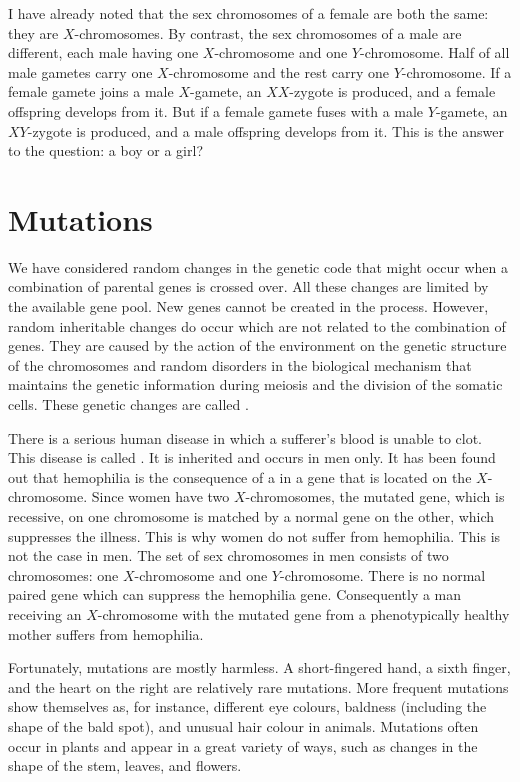  I have already noted that the sex chromosomes of
a female are both the same: they are $X$-chromosomes. By contrast, the
sex chromosomes of a male are different, each male having one
$X$-chromosome and one $Y$-chromosome. Half of all male gametes carry
one $X$-chromosome and the rest carry one $Y$-chromosome. If a female
gamete joins a male $X$-gamete, an $XX$-zygote is produced, and a female
offspring develops from it. But if a female gamete fuses with a male
$Y$-gamete, an $XY$-zygote is produced, and a male offspring develops from it. This is the answer to the question: a boy or a girl?

\section{Mutations }%
We have considered random changes in the genetic code that might
occur when a combination of parental genes is crossed over. All these
changes are limited by the available gene pool. New genes cannot be
created in the process. However, random inheritable changes do occur
which are not related to the combination of genes. They are caused by
the action of the environment on the genetic structure of the
chromosomes and random disorders in the biological mechanism that
maintains the genetic information during meiosis and the division of the
somatic cells. These genetic changes are called .

 There is a serious human disease in
which a sufferer's blood is unable to clot. This disease is called . It is inherited and occurs in men only. It has been found out that hemophilia is the consequence of a  in a gene that is located on the $X$-chromosome. Since women have two $X$-chromosomes, the mutated gene, which is recessive, on one chromosome is matched by
a normal gene on the other, which suppresses the illness. This is why
women do not suffer from hemophilia. This is not the case in men. The
set of sex chromosomes in men consists of two  chromosomes: one $X$-chromosome and one $Y$-chromosome. There is no normal paired gene which can suppress the hemophilia gene. Consequently a man receiving an $X$-chromosome with the mutated gene from a phenotypically healthy mother suffers from hemophilia.

Fortunately, mutations are mostly harmless. A short-fingered hand,
a sixth finger, and the heart on the right are relatively rare mutations.
More frequent mutations show themselves as, for instance, different eye
colours, baldness (including the shape of the bald spot), and unusual
hair colour in animals. Mutations often occur in plants and appear in
a great variety of ways, such as changes in the shape of the stem, leaves,
and flowers.

